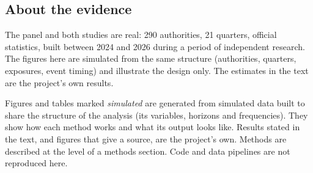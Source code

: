 \documentclass[
  british,
  a4paper,
]{article}
\begin{document}
\subsection{About the evidence}\label{about-the-evidence}

The panel and both studies are real: 290 authorities, 21 quarters,
official statistics, built between 2024 and 2026 during a period of
independent research. The figures here are simulated from the same
structure (authorities, quarters, exposures, event timing) and
illustrate the design only. The estimates in the text are the project's
own results.

Figures and tables marked \emph{simulated} are generated from simulated
data built to share the structure of the analysis (its variables,
horizons and frequencies). They show how each method works and what its
output looks like. Results stated in the text, and figures that give a
source, are the project's own. Methods are described at the level of a
methods section. Code and data pipelines are not reproduced here.
\end{document}
